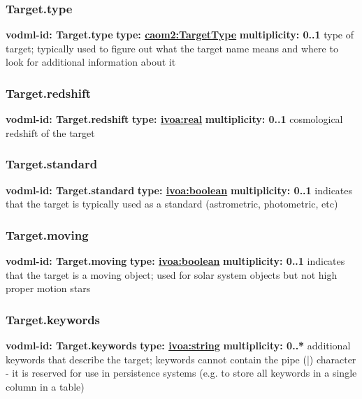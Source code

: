     \subsubsection{Target.type}
      \textbf{vodml-id: Target.type} \newline
      \textbf{type: \hyperref[sect:TargetType]{caom2:TargetType}} \newline
      \textbf{multiplicity: 0..1} \newline
      type of target; typically used to figure out what the target name means and where to look for additional information about it

    \subsubsection{Target.redshift}
      \textbf{vodml-id: Target.redshift} \newline
      \textbf{type: \hyperref[sect:ivoa]{ivoa:real}} \newline
      \textbf{multiplicity: 0..1} \newline
      cosmological redshift of the target

    \subsubsection{Target.standard}
      \textbf{vodml-id: Target.standard} \newline
      \textbf{type: \hyperref[sect:ivoa]{ivoa:boolean}} \newline
      \textbf{multiplicity: 0..1} \newline
      indicates that the target is typically used as a standard (astrometric, photometric, etc)

    \subsubsection{Target.moving}
      \textbf{vodml-id: Target.moving} \newline
      \textbf{type: \hyperref[sect:ivoa]{ivoa:boolean}} \newline
      \textbf{multiplicity: 0..1} \newline
      indicates that the target is a moving object; used for solar system objects but not high proper motion stars

    \subsubsection{Target.keywords}
      \textbf{vodml-id: Target.keywords} \newline
      \textbf{type: \hyperref[sect:ivoa]{ivoa:string}} \newline
      \textbf{multiplicity: 0..*} \newline
      additional keywords that describe the target; keywords cannot contain the pipe (|) character - it is reserved for use in persistence systems (e.g. to store all keywords in a single column in a table)

